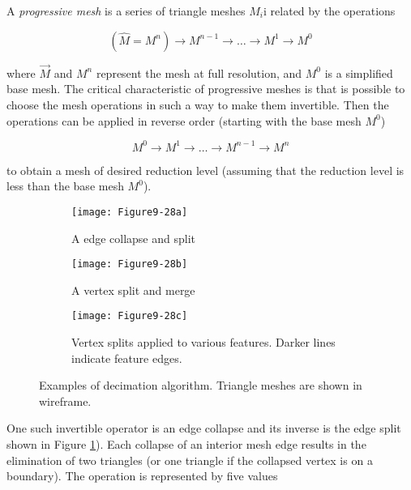 \begin{description}
A \emph{progressive mesh} is a series of triangle meshes $M_i$i related by the operations

\begin{equation}\label{eq:9.14}
\left(\hat{M} = M^n \right) \to M^{n - 1} \to \ldots \to M^1 \to M^0
\end{equation}

where $\vec{M}$ and $M^n$ represent the mesh at full resolution, and $M^0$ is a simplified base mesh. The critical characteristic of progressive meshes is that is possible to choose the mesh operations in such a way to make them invertible. Then the operations can be applied in reverse order (starting with the base mesh $M^0$)

\begin{equation}\label{eq:9.15}
M^0 \to M^1 \to \ldots \to M^{n - 1} \to M^n
\end{equation}

to obtain a mesh of desired reduction level (assuming that the reduction level is less than the base mesh $M^0$).

\begin{figure}[htb]
    \centering
	\begin{subfigure}[h]{0.96\linewidth}
		\texttt{[image: Figure9-28a]}
		\captionsetup{justification=centering}
		\caption{A edge collapse and split}
		\label{fig:Figure9-28a}
	\end{subfigure}
	\hfill
	\begin{subfigure}[h]{0.96\linewidth}
		\texttt{[image: Figure9-28b]}
		\captionsetup{justification=centering}
		\caption{A vertex split and merge}
		\label{fig:Figure9-28b}
	\end{subfigure}
	\hfill
	\begin{subfigure}[h]{0.96\linewidth}
		\texttt{[image: Figure9-28c]}
		\captionsetup{justification=centering}
        \caption{Vertex splits applied to various features. Darker lines indicate feature edges.}
		\label{fig:Figure9-28c}
	\end{subfigure}
	\caption{Examples of decimation algorithm. Triangle meshes are shown in wireframe.}\label{fig:Figure9-28}
\end{figure}

One such invertible operator is an edge collapse and its inverse is the edge split shown in Figure \ref{fig:Figure9-28a}). Each collapse of an interior mesh edge results in the elimination of two triangles (or one triangle if the collapsed vertex is on a boundary). The operation is represented by five values


\end{description}

